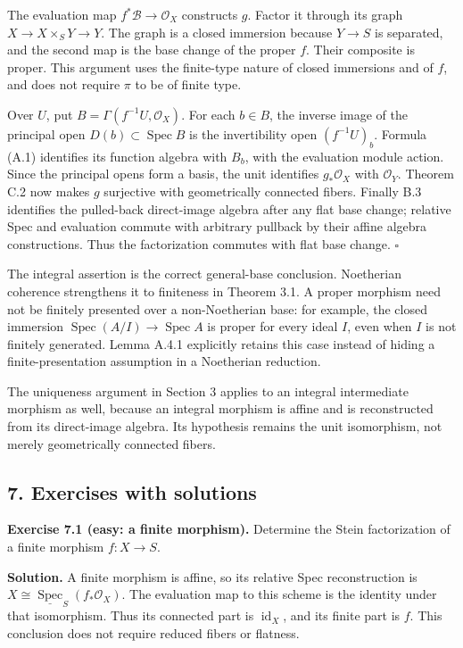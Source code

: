 \documentclass[11pt]{article}
\begin{document}
The evaluation map \(f^*\mathcal B\to\mathcal O_X\) constructs \(g\).
Factor it through its graph \(X\to X\times_SY\to Y\). The graph is a
closed immersion because \(Y\to S\) is separated, and the second map is
the base change of the proper \(f\). Their composite is proper. This
argument uses the finite-type nature of closed immersions and of \(f\),
and does not require \(\pi\) to be of finite type.

Over \(U\), put \(B=\Gamma(f^{-1}U,\mathcal O_X)\). For each \(b\in B\),
the inverse image of the principal open
\(D(b)\subset\operatorname{Spec}B\) is the invertibility open
\((f^{-1}U)_b\). Formula (A.1) identifies its function algebra with
\(B_b\), with the evaluation module action. Since the principal opens
form a basis, the unit identifies \(g_*\mathcal O_X\) with
\(\mathcal O_Y\). Theorem C.2 now makes \(g\) surjective with
geometrically connected fibers. Finally B.3 identifies the pulled-back
direct-image algebra after any flat base change; relative Spec and
evaluation commute with arbitrary pullback by their affine algebra
constructions. Thus the factorization commutes with flat base change.
\(\square\)

The integral assertion is the correct general-base conclusion.
Noetherian coherence strengthens it to finiteness in Theorem 3.1. A
proper morphism need not be finitely presented over a non-Noetherian
base: for example, the closed immersion
\(\operatorname{Spec}(A/I)\to\operatorname{Spec}A\) is proper for every
ideal \(I\), even when \(I\) is not finitely generated. Lemma A.4.1
explicitly retains this case instead of hiding a finite-presentation
assumption in a Noetherian reduction.

The uniqueness argument in Section 3 applies to an integral intermediate
morphism as well, because an integral morphism is affine and is
reconstructed from its direct-image algebra. Its hypothesis remains the
unit isomorphism, not merely geometrically connected fibers.

\subsection{7. Exercises with
solutions}\label{exercises-with-solutions-10}

\textbf{Exercise 7.1 (easy: a finite morphism).} Determine the Stein
factorization of a finite morphism \(f:X\to S\).

\textbf{Solution.} A finite morphism is affine, so its relative Spec
reconstruction is
\(X\cong\underline{\operatorname{Spec}}_S(f_*\mathcal O_X)\). The
evaluation map to this scheme is the identity under that isomorphism.
Thus its connected part is \(\operatorname{id}_X\), and its finite part
is \(f\). This conclusion does not require reduced fibers or flatness.
\end{document}
